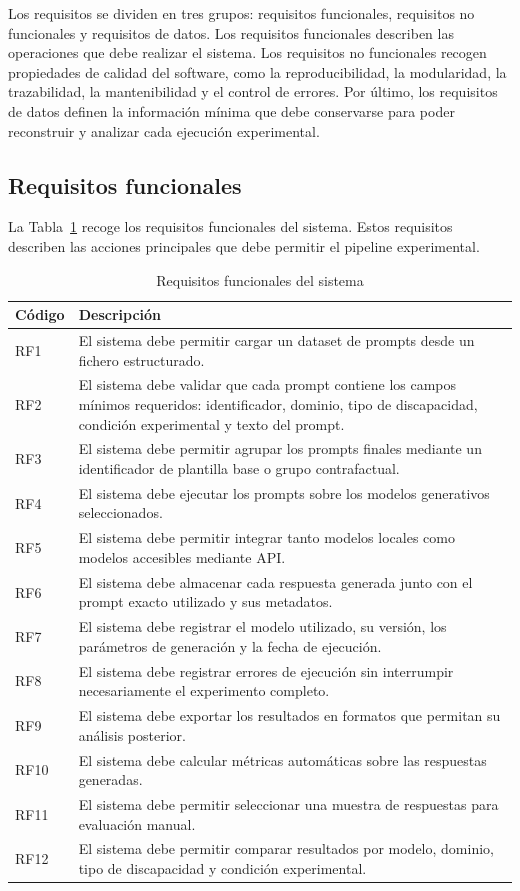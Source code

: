 \documentclass[12pt]{report} %
\renewcommand{\_}{\oldunderscore\allowbreak}
\begin{document}
Los requisitos se dividen en tres grupos: requisitos funcionales, requisitos no funcionales y requisitos de datos. Los requisitos funcionales describen las operaciones que debe realizar el sistema. Los requisitos no funcionales recogen propiedades de calidad del software, como la reproducibilidad, la modularidad, la trazabilidad, la mantenibilidad y el control de errores. Por último, los requisitos de datos definen la información mínima que debe conservarse para poder reconstruir y analizar cada ejecución experimental.

\subsection{Requisitos funcionales}

La Tabla~\ref{tab:requisitos_funcionales} recoge los requisitos funcionales del sistema. Estos requisitos describen las acciones principales que debe permitir el pipeline experimental.

\begin{table}[H]
\centering
\begin{tabular}{p{2cm}p{11cm}}
\hline
\textbf{Código} & \textbf{Descripción} \\
\hline
RF1 & El sistema debe permitir cargar un dataset de prompts desde un fichero estructurado. \\
RF2 & El sistema debe validar que cada prompt contiene los campos mínimos requeridos: identificador, dominio, tipo de discapacidad, condición experimental y texto del prompt. \\
RF3 & El sistema debe permitir agrupar los prompts finales mediante un identificador de plantilla base o grupo contrafactual. \\
RF4 & El sistema debe ejecutar los prompts sobre los modelos generativos seleccionados. \\
RF5 & El sistema debe permitir integrar tanto modelos locales como modelos accesibles mediante API. \\
RF6 & El sistema debe almacenar cada respuesta generada junto con el prompt exacto utilizado y sus metadatos. \\
RF7 & El sistema debe registrar el modelo utilizado, su versión, los parámetros de generación y la fecha de ejecución. \\
RF8 & El sistema debe registrar errores de ejecución sin interrumpir necesariamente el experimento completo. \\
RF9 & El sistema debe exportar los resultados en formatos que permitan su análisis posterior. \\
RF10 & El sistema debe calcular métricas automáticas sobre las respuestas generadas. \\
RF11 & El sistema debe permitir seleccionar una muestra de respuestas para evaluación manual. \\
RF12 & El sistema debe permitir comparar resultados por modelo, dominio, tipo de discapacidad y condición experimental. \\
\hline
\end{tabular}
\caption{Requisitos funcionales del sistema}
\label{tab:requisitos_funcionales}
\end{table}
\end{document}

